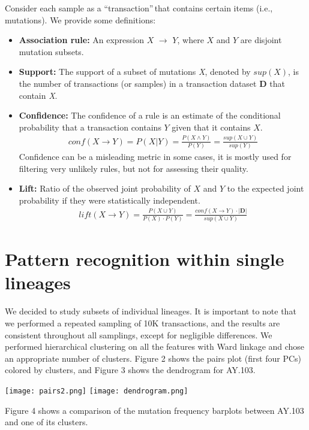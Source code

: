 \documentclass[a0,landscape]{a0poster}
\begin{document}
\begin{multicols}{4}
		Consider each sample as a \textquotedblleft transaction\textquotedblright$\,$that contains certain items (i.e., mutations). We provide some definitions:
		\begin{itemize}
			\item \textbf{Association rule:} An expression $X$ $\rightarrow$ $Y$, where $X$ and $Y$ are disjoint mutation subsets\cite{arules}. 
			\item \textbf{Support:} The support of a subset of mutations \textit{X}, denoted by $sup(X)$, is the number of transactions (or samples) in a transaction dataset \textbf{D} that contain \textit{X}. 
			\item \textbf{Confidence:} The confidence of a rule is an estimate of the conditional probability that a transaction contains $Y$ given that it contains $X$.
			\begin{align*}
				conf(X \rightarrow Y) = P(X|Y) = \frac{P(X \land Y)}{P(Y)} = \frac{sup(X \cup Y)}{sup(Y)}
			\end{align*}
			Confidence can be a misleading metric in some cases, it is mostly used for filtering very unlikely rules, but not for assessing their quality.
			\item \textbf{Lift:} Ratio of the observed joint probability of $X$ and $Y$ to the expected joint probability if they were statistically independent.	
			\begin{align*}
				lift(X \rightarrow Y) = \frac{P(X\cup Y)}{P(X)\cdot P(Y)} = \frac{conf(X\rightarrow Y)\cdot |\mathbf{D}|}{sup(X\cup Y)}
			\end{align*}
		\end{itemize}
		
		\section*{Pattern recognition within single lineages}
		We decided to study subsets of individual lineages. It is important to note that we performed a repeated sampling of 10K transactions, and the results are consistent throughout all samplings, except for negligible differences. We performed hierarchical clustering on all the features with Ward linkage and chose an appropriate number of clusters. Figure 2 shows the pairs plot (first four PCs) colored by clusters, and Figure 3 shows the dendrogram for AY.103. 
		\begin{center}\vspace{1cm}
			\texttt{[image: pairs2.png]}
			\texttt{[image: dendrogram.png]}
		\end{center}\vspace{1cm}
		Figure 4 shows a comparison of the mutation frequency barplots between AY.103 and one of its clusters. 


\end{multicols}
\end{document}
